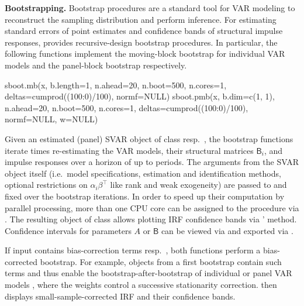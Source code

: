\textbf{Bootstrapping.} Bootstrap procedures are a standard tool for VAR modeling to reconstruct the sampling distribution and perform inference. For estimating standard errors of point estimates and confidence bands of structural impulse responses,  provides recursive-design bootstrap procedures. In particular, the following functions implement the moving-block bootstrap for individual VAR models \citep{BruggemannEtAl2016} and the panel-block bootstrap \citep{EmptingEtAl2026} respectively. 
\begin{CodeChunk}
\begin{CodeInput}
sboot.mb(x, b.length=1, n.ahead=20, n.boot=500, n.cores=1, 
	  deltas=cumprod((100:0)/100), normf=NULL)
sboot.pmb(x, b.dim=c(1, 1), n.ahead=20, n.boot=500, n.cores=1, 
	  deltas=cumprod((100:0)/100), normf=NULL, w=NULL)
\end{CodeInput}
\end{CodeChunk}
Given an estimated (panel) SVAR object  of class  resp.~, the bootstrap functions iterate  times re-estimating the VAR models, their structural matrices $ \mathsf{B}_i $, and impulse responses over a horizon of up to  periods. The arguments from the SVAR object itself (i.e.~model specifications, estimation and identification methods, optional restrictions on $ \alpha_i \beta^\top $ like rank and weak exogeneity) are passed to and fixed over the bootstrap iterations. In order to speed up their computation by parallel processing, more than one CPU core can be assigned to the procedure via . The resulting  object of class  allows plotting IRF confidence bands via '  method. Confidence intervals for parameters $ A $ or $ \mathsf{B} $ can be viewed via  and exported via .

If input  contains bias-correction terms  resp.~, both functions perform a bias-corrected bootstrap. For example, objects from a first bootstrap contain such terms and thus enable the bootstrap-after-bootstrap of individual \citep{Kilian1998} or panel VAR models \citep{EmptingEtAl2026}, where the weights  control a successive stationarity correction.  then displays small-sample-corrected IRF and their confidence bands. 

